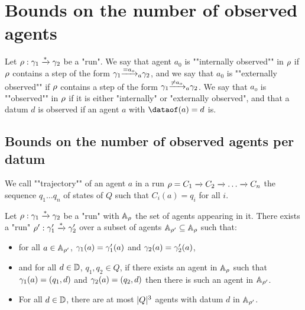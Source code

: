 \section{Bounds on the number of observed agents}
\label{sec:bounds-observed-agents}

\begin{definition}
	Let $\run : \config_1 \xrightarrow{*} \config_2$ be a "run".
	We say that agent $a_0$ is ""internally observed"" in $\run$ if $\run$ contains a step of the form $\config_1 \step{=}{a}{a_o} \config_2$, and we say that $a_0$ is ""externally observed"" if $\run$ contains a step of the form $\config_1 \step{\neq}{a}{a_o} \config_2$.
	We say that $a_o$ is ""observed"" in $\run$ if it is either "internally" or "externally observed", and that a datum $d$ is observed if an agent $a$ with $\dataof(a) =d$ is. 
\end{definition}

\subsection{Bounds on the number of observed agents per datum}

We call  ""trajectory"" of an agent $a$ in a run $\run=C_1 \xrightarrow{} C_2 \xrightarrow{} \ldots \xrightarrow{} C_n$ 
the sequence $q_1 \ldots q_n$ of states of $Q$ such that  $C_i(a)=q_i$ for all $i$.

\begin{lemma}
	\label{lem:agents-core-lemma}
	Let $\run : \config_1 \xrightarrow{*} \config_2$ be a "run" with $\Agentset_{\run}$ the set of agents appearing in it. There exists a "run" $\run' : \config'_1 \xrightarrow{*} \config'_2$ over a subset of agents $\Agentset_{\run'} \subseteq \Agentset_{\run}$ such that:
	\begin{itemize}
		\item for all $a \in \Agentset_{\run'}$, $\config_1(a) = \config'_1(a)$ and $\config_2(a) = \config'_2(a)$,
		
		\item and for all $d \in \Dataset$, $q_1, q_2 \in Q$, if there exists an agent in $\Agentset_{\run}$ such that $\config_1(a) = (q_1, d)$ and $\config_2(a) = (q_2, d)$ then there is such an agent in $\Agentset_{\run'}$.
		
		\item For all $d \in \Dataset$, there are at most $\size{Q}^3$ agents with datum $d$ in $\Agentset_{\run'}$.
	\end{itemize}
\end{lemma}

